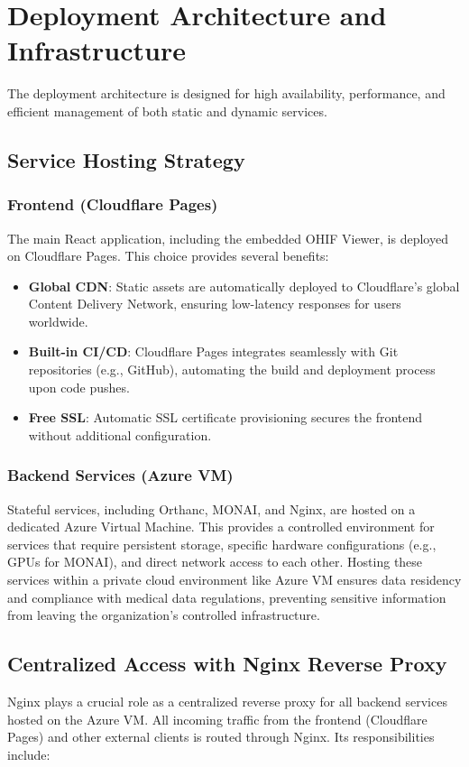 \section{ Deployment Architecture and Infrastructure}

The deployment architecture is designed for high availability, performance, and efficient management of both static and dynamic services.

\subsection{Service Hosting Strategy}
\subsubsection*{Frontend (Cloudflare Pages)}
The main React application, including the embedded OHIF Viewer, is deployed on Cloudflare Pages. This choice provides several benefits:

\begin{itemize}
    \item \textbf{Global CDN}: Static assets are automatically deployed to Cloudflare's global Content Delivery Network, ensuring low-latency responses for users worldwide.
    \item \textbf{Built-in CI/CD}: Cloudflare Pages integrates seamlessly with Git repositories (e.g., GitHub), automating the build and deployment process upon code pushes.
    \item \textbf{Free SSL}: Automatic SSL certificate provisioning secures the frontend without additional configuration.
\end{itemize}

\subsubsection*{Backend Services (Azure VM)}
Stateful services, including Orthanc, MONAI, and Nginx, are hosted on a dedicated Azure Virtual Machine. This provides a controlled environment for services that require persistent storage, specific hardware configurations (e.g., GPUs for MONAI), and direct network access to each other. Hosting these services within a private cloud environment like Azure VM ensures data residency and compliance with medical data regulations, preventing sensitive information from leaving the organization's controlled infrastructure.

\subsection{Centralized Access with Nginx Reverse Proxy}
Nginx plays a crucial role as a centralized reverse proxy for all backend services hosted on the Azure VM. All incoming traffic from the frontend (Cloudflare Pages) and other external clients is routed through Nginx. Its responsibilities include:

